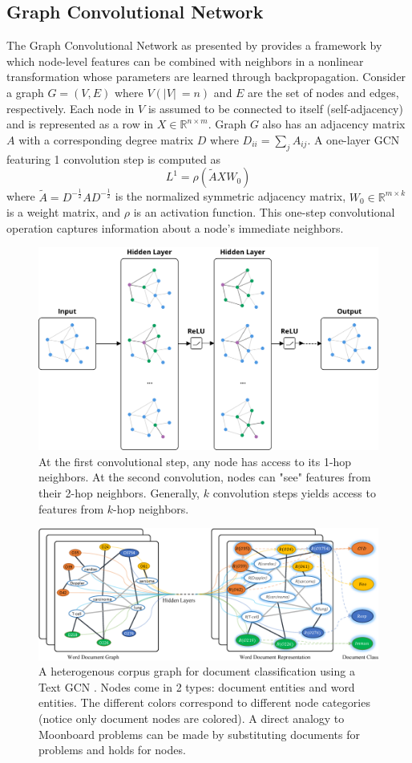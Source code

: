 \documentclass{article}
\begin{document}
\subsection{Graph Convolutional Network}
The Graph Convolutional Network as presented by \cite{kipf2016semisupervised} provides a framework by which node-level features can be combined with neighbors in a nonlinear transformation whose parameters are learned through backpropagation. Consider a graph $G = (V,E)$ where $V(\lvert V\rvert\ = n)$ and $E$ are the set of nodes and edges, respectively. Each node in $V$ is assumed to be connected to itself (self-adjacency) and is represented as a row in $X \in \mathbb{R}^{n \times m}$. Graph $G$ also has an adjacency matrix $A$ with a corresponding degree matrix $D$ where $D_{ii} = \sum_{j}A_{ij}$. A one-layer GCN featuring 1 convolution step is computed as
\begin{equation}
L^{1} = \rho(\widetilde{A}XW_{0})
\end{equation}
where $\widetilde{A} = D^{-\frac{1}{2}}AD^{-\frac{1}{2}}$ is the normalized symmetric adjacency matrix, $W_0 \in \mathbb{R}^{m \times k}$ is a weight matrix, and $\rho$ is an activation function. This one-step convolutional operation captures information about a node's immediate neighbors. 

\begin{figure}
\centering
\includegraphics[width=.5\linewidth]{gcn_2steps}
\caption{At the first convolutional step, any node has access to its 1-hop neighbors. At the second convolution, nodes can "see" features from their 2-hop neighbors. Generally, $k$ convolution steps yields access to features from $k$-hop neighbors.}
\label{fig: Graph Convolutional Network}
\end{figure}

\begin{figure}
\centering
\includegraphics[width=.6\linewidth]{textGCN}
\caption{A heterogenous corpus graph for document classification using a Text GCN \cite{yao2018graph}. Nodes come in 2 types: document entities and word entities. The different colors correspond to different node categories (notice only document nodes are colored). A direct analogy to Moonboard problems can be made by substituting documents for problems and holds for nodes.}
\label{fig: Corpus graph for Text Graph Convolutional Network}
\end{figure}
\end{document}
